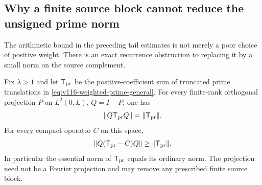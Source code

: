\subsection*{Why a finite source block cannot reduce the unsigned prime norm}

The arithmetic bound in the preceding tail estimates is not merely a
poor choice of positive weight.  There is an exact recurrence obstruction
to replacing it by a small norm on the source complement.

\begin{proposition}
\label{prop:v119-prime-essential}
Fix $\lambda>1$ and let $\mathsf T_{\rm pr}$ be the positive-coefficient
sum of truncated prime translations in
\eqref{eq:v116-weighted-prime-general}.  For every finite-rank
orthogonal projection $P$ on $L^2(0,L)$, $Q=I-P$, one has
\begin{equation}\label{eq:v119-prime-compression}
 \|Q\mathsf T_{\rm pr}Q\|=\|\mathsf T_{\rm pr}\|.
\end{equation}
For every compact operator $C$ on this space,
\begin{equation}\label{eq:v119-prime-compact}
 \|Q(\mathsf T_{\rm pr}-C)Q\|\ge\|\mathsf T_{\rm pr}\|.
\end{equation}
In particular the essential norm of $\mathsf T_{\rm pr}$ equals its
ordinary norm.  The projection need not be a Fourier projection and
may remove any prescribed finite source block.
\end{proposition}
